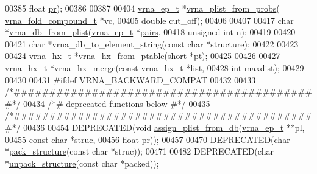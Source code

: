 \begin{DoxyCode}
00385                       \textcolor{keywordtype}{float}       \hyperlink{fold__vars_8h_ac98ec419070aee6831b44e5c700f090f}{pr});
00386 
00387 
00404 \hyperlink{group__struct__utils_structvrna__elem__prob__s}{vrna\_ep\_t} *\hyperlink{group__pf__fold_ga94f6efc0b8d8712b023452794a0a5bd2}{vrna\_plist\_from\_probs}(
      \hyperlink{group__fold__compound_structvrna__fc__s}{vrna\_fold\_compound\_t} *vc,
00405                                  \textcolor{keywordtype}{double}               cut\_off);
00406 
00407 
00417 \textcolor{keywordtype}{char} *\hyperlink{group__struct__utils_ga6a51a36b9245d0bac868c5cd172b9611}{vrna\_db\_from\_plist}(\hyperlink{group__struct__utils_structvrna__elem__prob__s}{vrna\_ep\_t}    *\hyperlink{group__struct__utils_ga6341cbb704924824e0236c1dce791032}{pairs},
00418                          \textcolor{keywordtype}{unsigned} \textcolor{keywordtype}{int} n);
00419 
00420 
00421 \textcolor{keywordtype}{char} *vrna\_db\_to\_element\_string(\textcolor{keyword}{const} \textcolor{keywordtype}{char} *structure);
00422 
00423 
00424 \hyperlink{group__struct__utils_structvrna__hx__s}{vrna\_hx\_t} *vrna\_hx\_from\_ptable(\textcolor{keywordtype}{short} *pt);
00425 
00426 
00427 \hyperlink{group__struct__utils_structvrna__hx__s}{vrna\_hx\_t} *vrna\_hx\_merge(\textcolor{keyword}{const} \hyperlink{group__struct__utils_structvrna__hx__s}{vrna\_hx\_t}  *list,
00428                          \textcolor{keywordtype}{int}              maxdist);
00429 
00430 
00431 \textcolor{preprocessor}{#ifdef  VRNA\_BACKWARD\_COMPAT}
00432 
00433 \textcolor{comment}{/*###########################################*/}
00434 \textcolor{comment}{/*# deprecated functions below              #*/}
00435 \textcolor{comment}{/*###########################################*/}
00436 
00454 DEPRECATED(\textcolor{keywordtype}{void} \hyperlink{group__struct__utils_gab61df77cf7949cd516181fce0c3d7d78}{assign\_plist\_from\_db}(\hyperlink{group__struct__utils_structvrna__elem__prob__s}{vrna\_ep\_t}  **pl,
00455                                      \textcolor{keyword}{const} \textcolor{keywordtype}{char} *struc,
00456                                      \textcolor{keywordtype}{float}      \hyperlink{fold__vars_8h_ac98ec419070aee6831b44e5c700f090f}{pr}));
00457 
00470 DEPRECATED(\textcolor{keywordtype}{char} *\hyperlink{group__struct__utils_gac6dfa5e22928c087c6e09ff0054a7ced}{pack\_structure}(\textcolor{keyword}{const} \textcolor{keywordtype}{char} *struc));
00471 
00482 DEPRECATED(\textcolor{keywordtype}{char} *\hyperlink{group__struct__utils_ga071c6921efe1eb974f115ee6fefa3c39}{unpack\_structure}(\textcolor{keyword}{const} \textcolor{keywordtype}{char} *packed));

\end{DoxyCode}
